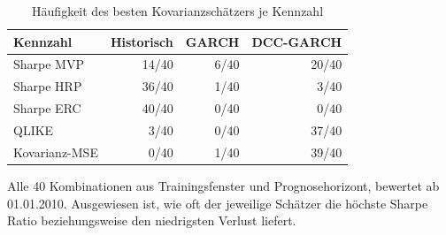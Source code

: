 \begin{table}[htbp]
  \centering
  \footnotesize
  \begin{tabular}{lrrr}
    \toprule
    Kennzahl & Historisch & GARCH & DCC-GARCH \\
    \midrule
    Sharpe MVP & 14/40 & 6/40 & 20/40 \\
    Sharpe HRP & 36/40 & 1/40 & 3/40 \\
    Sharpe ERC & 40/40 & 0/40 & 0/40 \\
    \midrule
    QLIKE & 3/40 & 0/40 & 37/40 \\
    Kovarianz-MSE & 0/40 & 1/40 & 39/40 \\
    \bottomrule
  \end{tabular}
  \caption{Häufigkeit des besten Kovarianzschätzers je Kennzahl}
  \label{tab:bestzaehlung}
  \begin{minipage}{\linewidth}\vspace{0.4em}\centering\footnotesize
  Alle 40 Kombinationen aus Trainingsfenster und Prognosehorizont, bewertet ab 01.01.2010. Ausgewiesen ist, wie oft der jeweilige Schätzer die höchste Sharpe Ratio beziehungsweise den niedrigsten Verlust liefert.
  \end{minipage}
\end{table}
